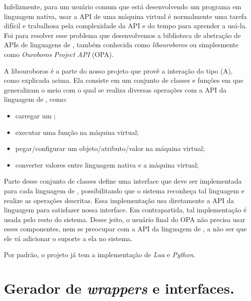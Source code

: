   Infelizmente, para um usuário comum que está desenvolvendo um programa em
  linguagem nativa, usar a API de uma máquina virtual é normalmente uma tarefa
  difícil e trabalhosa pela complexidade da API e do tempo para aprender a 
  usá-la. Foi para resolver esse problema que desenvolvemos a biblioteca de 
  abstração de APIs de linguagens de \script{}, também conhecida como 
  \textit{libouroboros} ou simplesmente como \emph{Ouroboros Project API} (OPA).
  
  A libouroboros é a parte do nosso projeto que provê a interação do tipo (A),
  como explicada acima. Ela consiste em um conjunto de classes e funções em 
  \CXX{} que generalizam o meio com o qual se realiza diversas operações com 
  a API da linguagem de \script{}, como:
  \begin{itemize}
    \item carregar um \script{};
    \item executar uma função na máquina virtual;
    \item pegar/configurar um objeto/atributo/valor na máquina virtual;
    \item converter valores entre linguagem nativa e a máquina virtual;
  \end{itemize}
  Parte desse conjunto de classes define uma interface que deve ser implementada para
  cada linguagem de \script{}, possibilitando que o sistema reconheça tal linguagem e 
  realize as operações descritas. Essa implementação usa diretamente a API da linguagem
  para satisfazer nossa interface. Em contrapartida, tal implementação é usada pelo 
  resto do sistema. Desse jeito, o usuário final do OPA não precisa usar esses 
  componentes, nem se preocupar com a API da linguagem de \script{}, a não ser que
  ele vá adicionar o suporte a ela no sistema.

  
  Por padrão, o projeto já tem a implementação de \textit{Lua} e \textit{Python}.
  
  
  
  \section{Gerador de \emph{wrappers} e interfaces.}
  \label{sec:estrutura:opwig}

